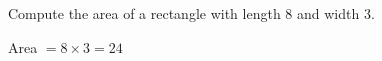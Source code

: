 \question Compute the area of a rectangle with length 8 and width 3.
\begin{solution}
Area $= 8 \times 3 = 24$
\end{solution}
